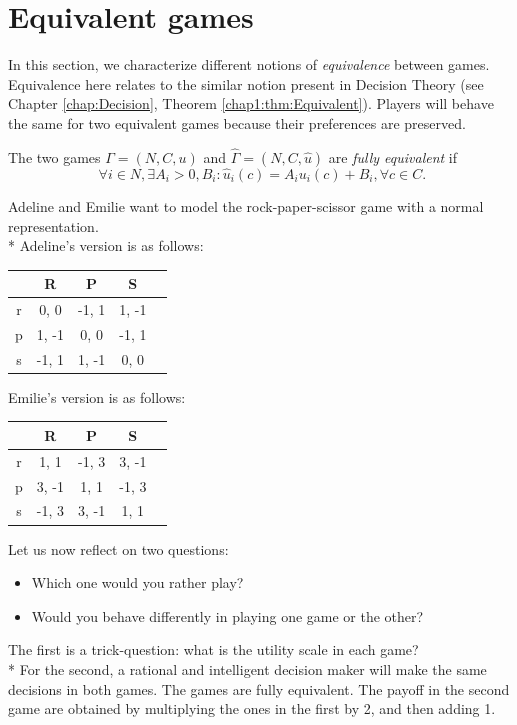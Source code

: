 \section{Equivalent games}
\label{chap2:subsec:Equivalences}

In this section, we characterize different notions of \emph{equivalence} between games.  Equivalence here relates to the similar notion present in Decision Theory (see Chapter \ref{chap:Decision}, Theorem \ref{chap1:thm:Equivalent}). Players will behave the same for two equivalent games because their preferences are preserved.\\

\begin{definition}
The two games $\Gamma = (N, C, u)$ and $\hat \Gamma = (N,C,\hat{u})$ are \emph{fully equivalent} if
$$\,\,\forall i \in N, \exists A_i > 0, B_i : \hat u_i(c) = A_i u_i(c) + B_i, \forall c \in C.$$
\label{chap2:def:fullEquivalence}
\end{definition}

\begin{example}
Adeline and Emilie want to model the rock-paper-scissor game with a normal representation. \\*
Adeline's version is as follows:
\begin{center}
\begin{tabular}{c|cccc}
   & R &  P & S \\
\hline r & 0, 0 &  -1, 1 & 1, -1 \\
 p & 1, -1 &  0, 0 & -1, 1 \\
 s & -1, 1 &  1, -1 & 0, 0 \\
\end{tabular}
\end{center}
Emilie's version is as follows:
\begin{center}
\begin{tabular}{c|cccc}
   & R &  P & S \\
\hline r & 1, 1 &  -1, 3 & 3, -1 \\
 p & 3, -1 &  1, 1 & -1, 3 \\
 s & -1, 3 &  3, -1 & 1, 1 \\
\end{tabular}
\end{center}
Let us now reflect on two questions:
\begin{itemize}
\item Which one would you rather play?
\item Would you behave differently in playing  one game or the other?
\end{itemize}
The first is a trick-question: what is the utility scale in each game?\\*
For the second, a rational and intelligent decision maker will make the same decisions in both games.
 The games are fully equivalent. The payoff in the second game are obtained by multiplying the ones in the first by 2, and then adding 1.
\end{example}

